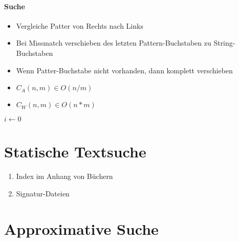 \paragraph{Suche}
\begin{itemize}
  \item Vergleiche Patter von Rechts nach Links
  \item Bei Missmatch verschieben des letzten Pattern-Buchstaben zu String-Buchstaben
  \item Wenn Patter-Buchstabe nicht vorhanden, dann komplett verschieben
  \item $C_A(n,m) \in O(n/m)$
  \item $C_W(n,m) \in O(n * m)$
\end{itemize}

\begin{algorithm}[H]


  $i \leftarrow 0$

\end{algorithm}


\section{Statische Textsuche}

\begin{enumerate}
  \item Index im Anhang von Büchern
  \item Signatur-Dateien
\end{enumerate}

\section{Approximative Suche}

